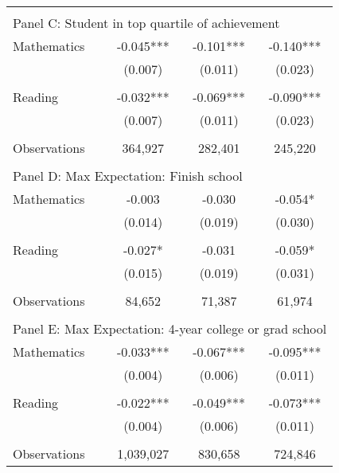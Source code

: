 {\begin{tabular}{lccc}
&  &  &   \\
\multicolumn{4}{l}{Panel C: Student in top quartile of achievement} \\
\hspace{3mm}Mathematics&      -0.045***&      -0.101***&      -0.140***\\
                    &     (0.007)   &     (0.011)   &     (0.023)   \\
 
&  &  &   \\
\hspace{3mm}Reading &      -0.032***&      -0.069***&      -0.090***\\
                    &     (0.007)   &     (0.011)   &     (0.023)   \\
                    &               &               &               \\
\hspace{3mm}Observations&     364,927   &     282,401   &     245,220   \\
 
&  &  &   \\
\multicolumn{4}{l}{Panel D: Max Expectation: Finish school} \\
\hspace{3mm}Mathematics&      -0.003   &      -0.030   &      -0.054*  \\
                    &     (0.014)   &     (0.019)   &     (0.030)   \\
 
&  &  &   \\
\hspace{3mm}Reading &      -0.027*  &      -0.031   &      -0.059*  \\
                    &     (0.015)   &     (0.019)   &     (0.031)   \\
                    &               &               &               \\
\hspace{3mm}Observations&      84,652   &      71,387   &      61,974   \\
 
&  &  &   \\
\multicolumn{4}{l}{Panel E: Max Expectation: 4-year college or grad school} \\
\hspace{3mm}Mathematics&      -0.033***&      -0.067***&      -0.095***\\
                    &     (0.004)   &     (0.006)   &     (0.011)   \\
 
&  &  &   \\
\hspace{3mm}Reading &      -0.022***&      -0.049***&      -0.073***\\
                    &     (0.004)   &     (0.006)   &     (0.011)   \\
                    &               &               &               \\
\hspace{3mm}Observations&   1,039,027   &     830,658   &     724,846   \\
 

\bottomrule
\end{tabular}
}
